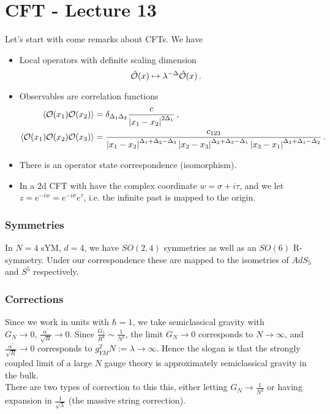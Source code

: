 \documentclass{article}
\begin{document}
\section{CFT - Lecture 13}
Let's start with come remarks about CFTs. We have 
\begin{itemize}
	\item Local operators with definite scaling dimension 
	\[
	\hat{\mathcal{O}}(x) \mapsto \lambda^{-\Delta} \hat{\mathcal{O}}(x) \, .
	\]
	\item Observables are correlation functions 
	\begin{align*}
	\left\langle \mathcal{O}(x_1) \mathcal{O}(x_2) \right\rangle &= \delta_{\Delta_1 \Delta_2} \frac{c}{\left\lvert x_1-x_2 \right\rvert^{2\Delta_1}} \, , \\
	\left\langle \mathcal{O}(x_1) \mathcal{O}(x_2) \mathcal{O}(x_3) \right\rangle &= \frac{c_{123}}{\left\lvert x_1 - x_2 \right\rvert^{\Delta_1 + \Delta_2 - \Delta_3} \left\lvert x_2-x_3 \right\rvert^{\Delta_2 + \Delta_3 - \Delta_1}\left\lvert x_3-x_1 \right\rvert^{\Delta_3 + \Delta_1 - \Delta_2}} \, .
	\end{align*}
\item There is an operator state correspondence (isomorphism). 
\item In a 2d CFT with have the complex coordinate $w = \sigma + i\tau$, and we let $z = e^{-i w} = e^{-i\sigma}e^{\tau}$, i.e. the infinite past is mapped to the origin.
\end{itemize}
\subsubsection{Symmetries}
In $N=4$ sYM, $d=4$, we have $SO(2,4)$ symmetries as well as an $SO(6)$ R-symmetry. Under our correspondence these are mapped to the isometries of $AdS_5$ and $S^5$ respectively. 
\subsubsection{Corrections}
 Since we work in units with $\hbar=1$, we take semiclassical gravity with $G_N \to 0, \, \frac{\alpha^\prime}{\sqrt{R}} \to 0$. Since $\frac{G_5}{R^8} \sim \frac{1}{N^2}$, the limit $G_N \to 0 $ corresponds to $N \to \infty$, and $\frac{\alpha^\prime}{\sqrt{R}} \to 0$ corresponds to $g_{YM}^2 N := \lambda \to \infty$. Hence the slogan is that the strongly coupled limit of a large $N$ gauge theory is approximately semiclassical gravity in the bulk. \\
There are two types of correction to this this, either letting $G_N \to \frac{1}{N^2}$ or having expansion in $\frac{1}{\sqrt{\lambda}}$ (the massive string correction). 
\end{document}

